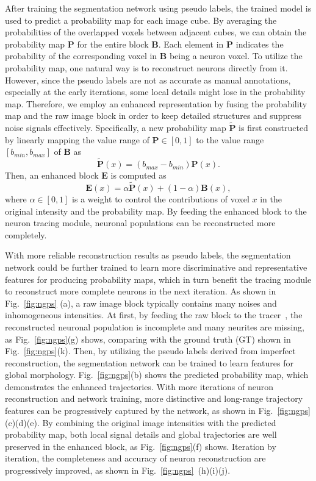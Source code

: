 After training the segmentation network using pseudo labels, the trained model is used to predict a probability map for each image cube. 
By averaging the probabilities of the overlapped voxels between adjacent cubes, we can obtain the probability map $\mathbf{P}$ for the entire block $\mathbf{B}$.
Each element in $\mathbf{P}$ indicates the probability of the corresponding voxel in $\mathbf{B}$ being a neuron voxel.
To utilize the probability map, one natural way is to reconstruct neurons directly from it.
However, since the pseudo labels are not as accurate as manual annotations, especially at the early iterations, some local details might lose in the probability map. Therefore, we employ an enhanced representation by fusing the probability map and the raw image block in order to keep detailed structures and suppress noise signals effectively.
Specifically, a new probability map $\widetilde{\mathbf{P}} $ is first constructed by linearly mapping the value range of $ \mathbf{P}\in [0,1] $ to the value range $[{b}_{min}, {b}_{max}]$ of $\mathbf{B}$ as
\begin{equation}
\widetilde{\mathbf{P}}(x) = ({b}_{max}-{b}_{min})\mathbf{P}(x).
\end{equation}
%
Then, an enhanced block $\mathbf{E}$ is computed as
\begin{equation}
\mathbf{E}(x) = \alpha\widetilde{\mathbf{P}}(x) + (1-\alpha)\mathbf{B}(x),
\label{equ: enhance}
\end{equation}
where $\alpha\in [0,1]$ is a weight to control the contributions of voxel $ x $ in the original intensity and the probability map. By feeding the enhanced block to the neuron tracing module, neuronal populations can be reconstructed more completely.


With more reliable reconstruction results as pseudo labels, the segmentation network could be further trained to learn more discriminative and representative features for producing probability maps, which in turn benefit the tracing module to reconstruct more complete neurons in the next iteration.
%
As shown in Fig.~\ref{fig:ngps} (a), a raw image block typically contains many noises and inhomogeneous intensities.
At first, by feeding the raw block to the tracer~\cite{Quan2015}, the reconstructed neuronal population is incomplete and many neurites are missing, as Fig.~\ref{fig:ngps}(g) shows, comparing with the ground truth (GT) shown in Fig.~\ref{fig:ngps}(k).
%
Then, by utilizing the pseudo labels derived from imperfect reconstruction, the segmentation network can be trained to learn features for global morphology. Fig.~\ref{fig:ngps}(b) shows the predicted probability map, which demonstrates the enhanced trajectories.
With more iterations of neuron reconstruction and network training, more distinctive and long-range trajectory features can be progressively captured by the network, as shown in Fig.~\ref{fig:ngps}(c)(d)(e).
By combining the original image intensities with the predicted probability map, both local signal details and global trajectories are well preserved in the enhanced block, as Fig.~\ref{fig:ngps}(f) shows.
Iteration by iteration, the completeness and accuracy of neuron reconstruction are progressively improved, as shown in Fig.~\ref{fig:ngps}~(h)(i)(j).


